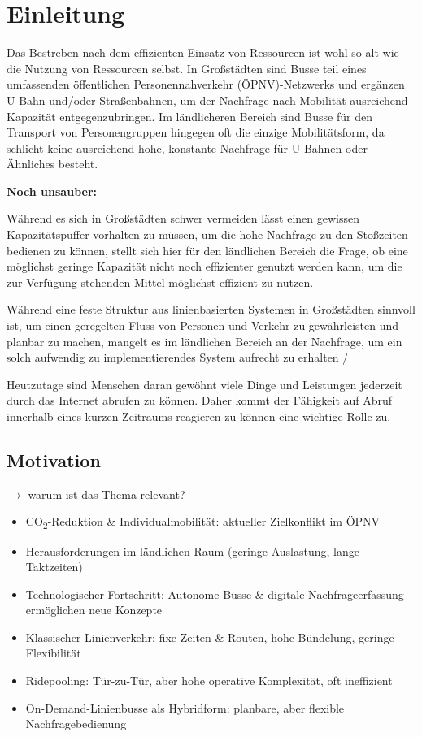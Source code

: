 \chapter{Einleitung}
\label{chapter:1}
Das Bestreben nach dem effizienten Einsatz von Ressourcen ist wohl so alt wie die Nutzung von Ressourcen selbst. In Großstädten sind Busse teil eines umfassenden öffentlichen Personennahverkehr (ÖPNV)-Netzwerks und ergänzen U-Bahn und/oder Straßenbahnen, um der Nachfrage nach Mobilität ausreichend Kapazität entgegenzubringen. Im ländlicheren Bereich sind Busse für den Transport von Personengruppen hingegen oft die einzige Mobilitätsform, da schlicht keine ausreichend hohe, konstante Nachfrage für U-Bahnen oder Ähnliches besteht.

\textbf{Noch unsauber:}

Während es sich in Großstädten schwer vermeiden lässt einen gewissen Kapazitätspuffer vorhalten zu müssen, um die hohe Nachfrage zu den Stoßzeiten bedienen zu können, stellt sich hier für den ländlichen Bereich die Frage, ob eine möglichst geringe Kapazität nicht noch effizienter genutzt werden kann, um die zur Verfügung stehenden Mittel möglichst effizient zu nutzen.

Während eine feste Struktur aus linienbasierten Systemen in Großstädten sinnvoll ist, um einen geregelten Fluss von Personen und Verkehr zu gewährleisten und planbar zu machen, mangelt es im ländlichen Bereich an der Nachfrage, um ein solch aufwendig zu implementierendes System aufrecht zu erhalten / 


Heutzutage sind Menschen daran gewöhnt viele Dinge und Leistungen jederzeit durch das Internet abrufen zu können. Daher kommt der Fähigkeit auf Abruf innerhalb eines kurzen Zeitraums reagieren zu können eine wichtige Rolle zu.     

\section{Motivation} 
\label{sec:1.1}
$\rightarrow$ warum ist das Thema relevant?


\begin{itemize}
    \item CO\textsubscript{2}-Reduktion \& Individualmobilität: aktueller Zielkonflikt im ÖPNV
    \item Herausforderungen im ländlichen Raum (geringe Auslastung, lange Taktzeiten)
    \item Technologischer Fortschritt: Autonome Busse \& digitale Nachfrageerfassung ermöglichen neue Konzepte
    \item Klassischer Linienverkehr: fixe Zeiten \& Routen, hohe Bündelung, geringe Flexibilität
    \item Ridepooling: Tür-zu-Tür, aber hohe operative Komplexität, oft ineffizient
    \item On-Demand-Linienbusse als Hybridform: planbare, aber flexible Nachfragebedienung
\end{itemize}
